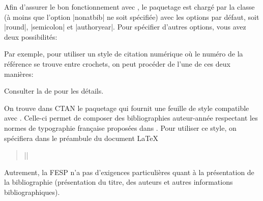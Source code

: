 Afin d'assurer le bon fonctionnement avec , le
paquetage  est chargé par la classe 
(à moins que l'option |nonatbib| ne soit spécifiée) avec les options
par défaut, soit |round|, |semicolon| et |authoryear|. Pour
spécifier d'autres options, vous avez deux possibilités:

Par exemple, pour utiliser un style de citation numérique où le
numéro de la référence se trouve entre crochets, on peut procéder de
l'une de ces deux manières:

Consulter la %
de  pour les détails.

On trouve dans CTAN le paquetage
\href{http://www.ctan.org/pkg/francais-bst/}{}
qui fournit une feuille de style compatible avec .
Celle-ci permet de composer des bibliographies auteur-année
respectant les normes de typographie française proposées dans
\cite{Malo:1996}. Pour utiliser ce style, on spécifiera dans le
préambule du document LaTeX
\begin{quote}
  ||
\end{quote}

Autrement, la FESP n'a pas d'exigences particulières quant à la
présentation de la bibliographie (présentation du titre, des auteurs
et autres informations bibliographiques).


